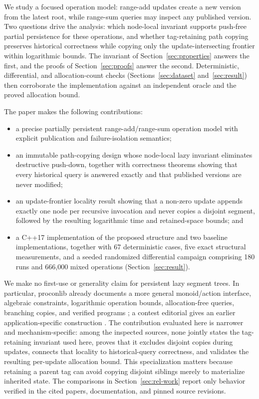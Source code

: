 \documentclass[conference]{IEEEtran}
\begin{document}
We study a focused operation model: range-add updates create a new version from the latest root,
while range-sum queries may inspect any published version. Two questions drive the analysis:
which node-local invariant supports push-free partial persistence for these operations, and
whether tag-retaining path copying preserves historical correctness while copying only the
update-intersecting frontier within logarithmic bounds. The invariant of
Section~\ref{sec:properties} answers the first, and the proofs of Section~\ref{sec:proofs}
answer the second. Deterministic, differential, and allocation-count checks
(Sections~\ref{sec:dataset} and~\ref{sec:result}) then corroborate the implementation against
an independent oracle and the proved allocation bound.

The paper makes the following contributions:

\begin{itemize}
  \item a precise partially persistent range-add/range-sum operation model with explicit
        publication and failure-isolation semantics;
  \item an immutable path-copying design whose node-local lazy invariant eliminates destructive
        push-down, together with correctness theorems showing that every historical query is
        answered exactly and that published versions are never modified;
  \item an update-frontier locality result showing that a non-zero update appends exactly one
        node per recursive invocation and never copies a disjoint segment, followed by the
        resulting logarithmic time and retained-space bounds; and
  \item a C++17 implementation of the proposed structure and two baseline implementations, together with
        67 deterministic cases, five exact structural measurements, and a seeded randomized
        differential campaign comprising 180 runs and 666{,}000 mixed operations
        (Section~\ref{sec:result}).
\end{itemize}

We make no first-use or generality claim for persistent lazy segment trees. In particular,
proconlib already documents a more general monoid/action interface, algebraic constraints,
logarithmic operation bounds, allocation-free queries, branching copies, and verified programs
\cite{proconlib2026persistent}; a contest editorial gives an earlier application-specific
construction \cite{orap2020unsquers}. The contribution evaluated here is
narrower and mechanism-specific: among the inspected sources, none jointly states the
tag-retaining invariant used here, proves that it excludes disjoint copies during updates, connects
that locality to historical-query correctness, and validates the resulting per-update allocation
bound. This specialization matters because retaining a parent tag can avoid copying disjoint
siblings merely to materialize inherited state. The comparisons in Section~\ref{sec:rel-work}
report only behavior verified in the cited papers, documentation, and pinned source revisions.
\end{document}
